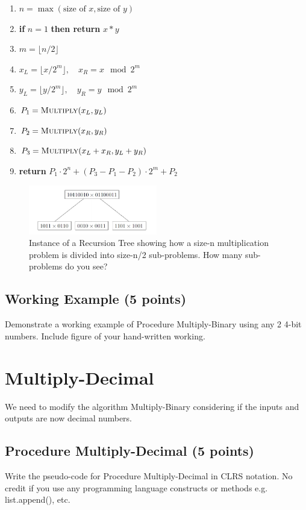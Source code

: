 \documentclass[a4paper]{article}
\begin{document}
\begin{enumerate}
    \item $n = \max(\text{size of } x, \text{size of } y)$
    \item \textbf{if} $n = 1$ \textbf{then return} $x * y$
    \item $m = \lfloor n / 2 \rfloor$
    \item $x_L = \lfloor x / 2^m \rfloor, \quad x_R = x \mod 2^m$
    \item $y_L = \lfloor y / 2^m \rfloor, \quad y_R = y \mod 2^m$
    \item $P_1 = \textsc{Multiply}(x_L, y_L)$
    \item $P_2 = \textsc{Multiply}(x_R, y_R)$
    \item $P_3 = \textsc{Multiply}(x_L + x_R, y_L + y_R)$
    \item \textbf{return} $P_1 \cdot 2^n + (P_3 - P_1 - P_2) \cdot 2^m + P_2$
\end{enumerate}

\begin{figure}[h!]
    \centering
    \includegraphics[width=0.5\textwidth]{binary.jpg}
    \caption{Instance of a Recursion Tree showing how a size-n multiplication problem is divided into size-n/2 sub-problems. How many sub-problems do you see?}
    \label{fig:example}
\end{figure}


\subsection{Working Example (5 points)}
Demonstrate a working example of Procedure Multiply-Binary using any 2 4-bit numbers. Include figure of your hand-written working.

\newpage
\section{Multiply-Decimal}
We need to modify the algorithm Multiply-Binary considering if the inputs and outputs are now decimal numbers.

\subsection{Procedure Multiply-Decimal  (5 points)}
Write the pseudo-code for Procedure Multiply-Decimal in CLRS notation. No credit if you use any programming language constructs or methods e.g. list.append(), etc. 
\end{document}
